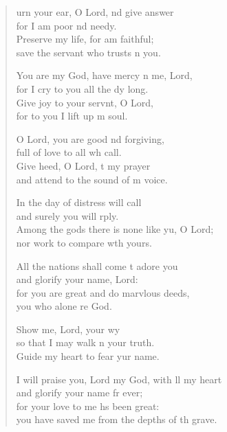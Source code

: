 \settowidth{\versewidth}{I will praise you, Lord my God, with all my heart *}
\begin{verse}%
  \begin{patverse}
urn your ear, O Lord, nd give answer\Med\\
for I am poor nd needy.\\
Preserve my life, for  am faithful;\Med\\
save the servant who trusts \pointup{\i}n you.

You are my God, have mercy n me, Lord,\Med\\
for I cry to you all the dy long.\\
Give joy to your servnt, O Lord,\Med\\
for to you I lift up m soul.

O Lord, you are good nd forgiving,\Med\\
full of love to all wh call.\\
Give heed, O Lord, t my prayer\Med\\
and attend to the sound of m voice.

In the day of distress  will call\Med\\
and surely you will rply.\\
Among the gods there is none like yu, O Lord;\Med\\
nor work to compare w\pointup{\i}th yours.

All the nations shall come t adore you\Med\\
and glorify your name,  Lord:\\
for you are great and do marvlous deeds,\Med\\
you who alone re God.

Show me, Lord, your wy\Flex\\
so that I may walk n your truth.\Med\\
Guide my heart to fear yur name.

I will praise you, Lord my God, with ll my heart\Med\\
and glorify your name fr ever;\\
for your love to me hs been great:\Med\\
you have saved me from the depths of th grave.


\end{patverse}
\end{verse}
